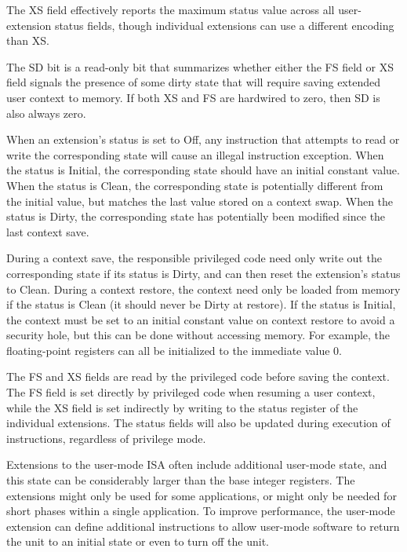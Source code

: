 \begin{commentary}
The XS field effectively reports the maximum status value across all
user-extension status fields, though individual extensions can use a
different encoding than XS.
\end{commentary}

The SD bit is a read-only bit that summarizes whether either the FS
field or XS field signals the presence of some dirty state that will
require saving extended user context to memory.  If both XS and FS are
hardwired to zero, then SD is also always zero.

When an extension's status is set to Off, any instruction that
attempts to read or write the corresponding state will cause an illegal instruction
exception.  When the status is Initial, the corresponding state should
have an initial constant value.  When the status is Clean, the
corresponding state is potentially different from the initial value,
but matches the last value stored on a context swap.  When the status
is Dirty, the corresponding state has potentially been modified since
the last context save.

During a context save, the responsible privileged code need only write
out the corresponding state if its status is Dirty, and can then reset
the extension's status to Clean.  During a context restore, the
context need only be loaded from memory if the status is Clean (it
should never be Dirty at restore).  If the status is Initial, the
context must be set to an initial constant value on context restore to
avoid a security hole, but this can be done without accessing memory.
For example, the floating-point registers can all be initialized to
the immediate value 0.

The FS and XS fields are read by the privileged code before saving the
context.  The FS field is set directly by privileged code when
resuming a user context, while the XS field is set indirectly by
writing to the status register of the individual extensions.  The
status fields will also be updated during execution of instructions,
regardless of privilege mode.

Extensions to the user-mode ISA often include additional user-mode
state, and this state can be considerably larger than the base integer
registers.  The extensions might only be used for some applications,
or might only be needed for short phases within a single application.
To improve performance, the user-mode extension can define additional
instructions to allow user-mode software to return the unit to an
initial state or even to turn off the unit.

